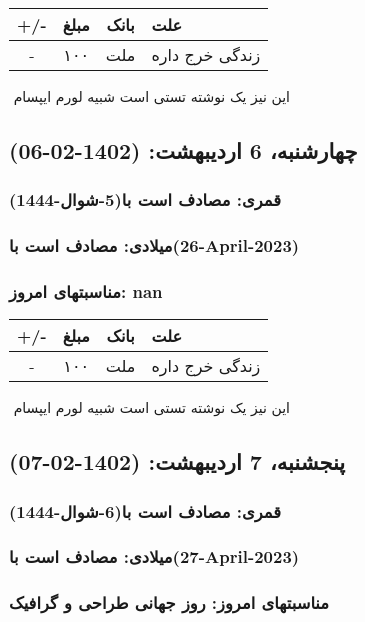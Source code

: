 \documentclass{article}
\newcommand{\rnote}[1]{\marginpar{\textcolor{color}{\StrSubstitute{\##1}{ }{\_}}}}
\newcommand{\myRow}[4]{
    #1 & #2 & #3 & #4 \\ \hline
}
\begin{document}
\begin{tabular}{ | c | c | c | p{5cm} |}
    \hline
    \myRow{ +/- }{مبلغ}{بانک}{علت}
    \myRow{-}{۱۰۰}{ملت}{زندگی خرج داره}
\end{tabular}
\newline
\newline

‌
\rnote{تست}
این نیز یک نوشته تستی است شبیه لورم ایپسام




\newpage
{}
\textcolor{color}{
\section{ چهارشنبه، 6 اردیبهشت: (1402-02-06) }
\subsubsection*{قمری: مصادف است با(5-شوال-1444)} 
\subsubsection*{میلادی: مصادف است با(26-April-2023)}
\subsubsection*{مناسبتهای امروز: nan}
}


\begin{tabular}{ | c | c | c | p{5cm} |}
    \hline
    \myRow{ +/- }{مبلغ}{بانک}{علت}
    \myRow{-}{۱۰۰}{ملت}{زندگی خرج داره}
\end{tabular}
\newline
\newline

‌
\rnote{تست}
این نیز یک نوشته تستی است شبیه لورم ایپسام




\newpage
{}
\textcolor{color}{
\section{ پنجشنبه، 7 اردیبهشت: (1402-02-07) }
\subsubsection*{قمری: مصادف است با(6-شوال-1444)} 
\subsubsection*{میلادی: مصادف است با(27-April-2023)}
\subsubsection*{مناسبتهای امروز: روز جهانی طراحی و گرافیک}
}
\end{document}
